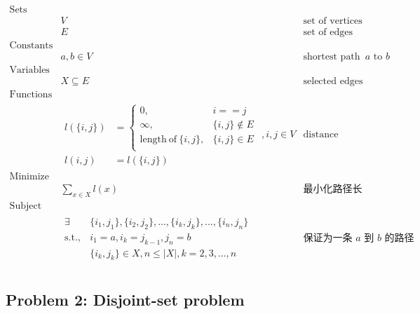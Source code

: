 \documentclass[11pt]{article}
\begin{document}
\begin{eqnarray*}
    \textrm{Sets} \\
        & V & \textrm{set of vertices} \\
        & E & \textrm{set of edges} \\
    \textrm{Constants} \\
        & a, b \in V & \textrm{shortest path from $a$ to $b$} \\
    \textrm{Variables} \\
        & X \subseteq E & \textrm{selected edges} \\
    \textrm{Functions} \\
        & \begin{array}{rl}
            l(\{i, j\}) &= \left\{
                \begin{array}{ll}
                    0,                              & i == j \\
                    \infty,                         & \{i, j\} \notin E \\
                    \mathrm{length\ of\ }\{i, j\},  & \{i, j\} \in E \\
                \end{array}
            \right. \\
            l(i, j) &= l(\{i, j\})
        \end{array}, i, j \in V & \textrm{distance between vertices} \\
    \textrm{Minimize} \\
        & \displaystyle \sum_{x \in X} l(x) & \textrm{最小化路径长度} \\
    \textrm{Subject to} \\ 
        & \begin{array}{rl}
            \exists & \{i_1, j_1\}, \{i_2, j_2\}, ..., \{i_k, j_k\}, ..., \{i_n, j_n\} \\
            \mathrm{s.t.,} & i_1 = a, i_k = j_{k-1}, j_n = b \\
                    & \{i_k, j_k\} \in X, n \leq |X|, k = 2, 3, ..., n
        \end{array} & \textrm{保证为一条 $a$ 到 $b$ 的路径} \\ 
\end{eqnarray*}


\newpage
\subsection*{Problem 2: Disjoint-set problem}
\end{document}
